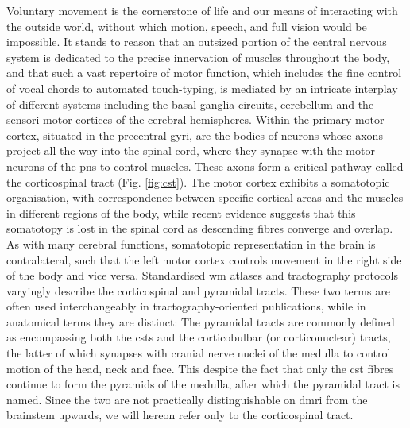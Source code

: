 Voluntary movement is the cornerstone of life and our means of interacting with the outside world, without which motion, speech, and full vision would be impossible.
It stands to reason that an outsized portion of the central nervous system is dedicated to the precise innervation of muscles throughout the body, and that such a vast repertoire of motor function, which includes the fine control of vocal chords to automated touch-typing, is mediated by an intricate interplay of different systems including the basal ganglia circuits, cerebellum and the sensori-motor cortices of the cerebral hemispheres\autocite{Kandel2021}.
Within the primary motor cortex, situated in the precentral gyri, are the bodies of neurons whose axons project all the way into the spinal cord, where they synapse with the motor neurons of the \gls{pns} to control muscles\autocite{Ebeling1992}.
These axons form a critical pathway called the corticospinal tract (Fig. \ref{fig:cst}).
The motor cortex exhibits a somatotopic organisation, with correspondence between specific cortical areas and the muscles in different regions of the body, while recent evidence suggests that this somatotopy is lost in the spinal cord as descending fibres converge and overlap\autocite{Lemon2023}.
As with many cerebral functions, somatotopic representation in the brain is contralateral, such that the left motor cortex controls movement in the right side of the body and vice versa.
Standardised \gls{wm} atlases and tractography protocols varyingly describe the corticospinal and pyramidal tracts.
These two terms are often used interchangeably in tractography-oriented publications, while in anatomical terms they are distinct:
The pyramidal tracts are commonly defined as encompassing both the \glspl{cst} and the corticobulbar (or corticonuclear) tracts, the latter of which synapses with cranial nerve nuclei of the medulla to control motion of the head, neck and face\autocite{Chenot2019}.
This despite the fact that only the \gls{cst} fibres continue to form the pyramids of the medulla, after which the pyramidal tract is named.
Since the two are not practically distinguishable on \gls{dmri} from the brainstem upwards, we will hereon refer only to the corticospinal tract.%
%
